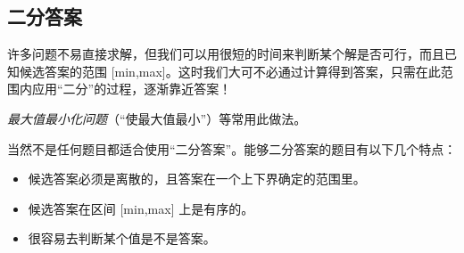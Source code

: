 \subsection{二分答案}
	
	许多问题不易直接求解，但我们可以用很短的时间来判断某个解是否可行，而且已知候选答案的范围 [min,max]。这时我们大可不必通过计算得到答案，只需在此范围内应用“二分”的过程，逐渐靠近答案！
	
	\emph{最大值最小化问题}（“使最大值最小”）等常用此做法。
	
	当然不是任何题目都适合使用“二分答案”。能够二分答案的题目有以下几个特点：
	
	\begin{itemize}
		\item 候选答案必须是离散的，且答案在一个上下界确定的范围里。
		\item 候选答案在区间 [min,max] 上是有序的。
		\item 很容易去判断某个值是不是答案。
	\end{itemize}
	